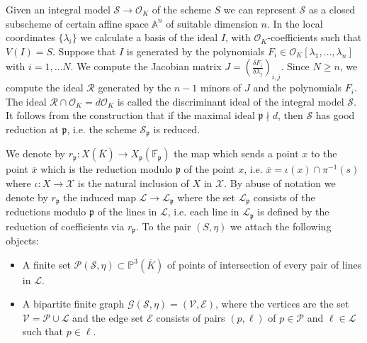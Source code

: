 \documentclass{article}
\theoremstyle{plain}
\theoremstyle{definition}
\numberwithin{equation}{section}
\begin{document}
Given an integral model $\mathcal{S}\rightarrow\mathcal{O}_{K}$ of the scheme $S$ we can represent $\mathcal{S}$ as a closed subscheme of certain affine space $\mathbb{A}^{n}$ of suitable dimension $n$. In the local coordinates $\{\lambda_{i}\}$ we calculate a basis of the ideal $I$, with $\mathcal{O}_{K}$-coefficients such that $V(I)=S$. Suppose that $I$ is generated by the polynomials $F_{i}\in\mathcal{O}_{K}[\lambda_{1},\ldots,\lambda_{n}]$ with $i=1,\ldots N$. We compute the Jacobian matrix $J=\left(\frac{\delta F_{i}}{\delta \lambda_{j}}\right)_{i,j}$. Since $N\geq n$, we compute the ideal $\mathcal{R}$ generated by the $n-1$ minors of $J$ and the polynomials $F_{i}$. The ideal $\mathcal{R}\cap\mathcal{O}_{K} = d\mathcal{O}_{K}$ is called the discriminant ideal of the integral model $\mathcal{S}$. It follows from the construction that if the maximal ideal $\mathfrak{p}\nmid d$, then $\mathcal{S}$ has good reduction at $\mathfrak{p}$, i.e. the scheme $\mathcal{S}_{\mathfrak{p}}$ is reduced.

We denote by $r_{\mathfrak{p}}:X(\overline{K})\rightarrow X_{\mathfrak{p}}(\overline{\mathbb{F}_{\mathfrak{p}}})$ the map which sends a point $x$ to the point $\overline{x}$ which is the reduction modulo $\mathfrak{p}$ of the point $x$, i.e. $\overline{x} = \iota(x)\cap \pi^{-1}(s)$ where $\iota:X\rightarrow \mathcal{X}$ is the natural inclusion of $X$ in $\mathcal{X}$. By abuse of notation we denote by $r_{\mathfrak{p}}$ the induced map $\mathcal{L}\rightarrow\mathcal{L}_{\mathfrak{p}}$ where the set $\mathcal{L}_{\mathfrak{p}}$ consists of the reductions modulo $\mathfrak{p}$ of the lines in $\mathcal{L}$, i.e. each line in $\mathcal{L}_{\mathfrak{p}}$ is defined by the reduction of coefficients via $r_{\mathfrak{p}}$.
To the pair $(S,\eta)$ we attach the following objects:
\begin{itemize}
	\item A finite set $\mathcal{P}(\mathcal{S},\eta)\subset \mathbb{P}^{3}(\overline{K})$ of points of intersection of every pair of lines in $\mathcal{L}$.
	\item A bipartite finite graph $\mathcal{G}(\mathcal{S},\eta) = (\mathcal{V},\mathcal{E})$, where the vertices are the set $\mathcal{V}=\mathcal{P}\cup\mathcal{L}$ and the edge set $\mathcal{E}$ consists of pairs $(p,\ell)$ of $p\in\mathcal{P}$ and $\ell\in\mathcal{L}$ such that $p\in\ell$.
\end{itemize}
\end{document}
